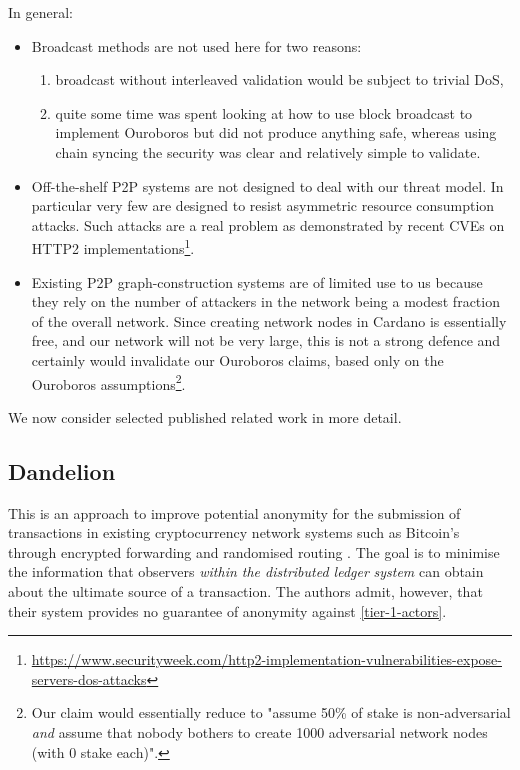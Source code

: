 \documentclass[11pt,a4paper]{article}
\begin{document}
In general:

\begin{itemize}
\item
  Broadcast methods are not used here for two reasons:

  \begin{enumerate}
  \def\labelenumi{\alph{enumi}.}
  \item
    broadcast without interleaved validation would be subject to trivial
    DoS,
  \item
    quite some time was spent looking at how to use block broadcast to
    implement Ouroboros but did not produce anything safe, whereas using
    chain syncing the security was clear and relatively simple to
    validate.
  \end{enumerate}
\item
  Off-the-shelf P2P systems are not designed to deal with our threat
  model. In particular very few are designed to resist asymmetric
  resource consumption attacks. Such attacks are a real problem as
  demonstrated by recent CVEs on HTTP2 implementations\footnote{\href{https://www.securityweek.com/http2-implementation-vulnerabilities-expose-servers-dos-attacks}{{https://www.securityweek.com/http2-implementation-vulnerabilities-expose-servers-dos-attacks}}}.
\item
  Existing P2P graph-construction systems are of limited use to us
  because they rely on the number of attackers in the network being a
  modest fraction of the overall network. Since creating network nodes
  in Cardano is essentially free, and our network will not be very
  large, this is not a strong defence and certainly would invalidate our
  Ouroboros claims, based only on the Ouroboros assumptions\footnote{Our
    claim would essentially reduce to "assume 50\% of stake is
    non-adversarial \emph{and} assume that nobody bothers to create
    1000 adversarial network nodes (with 0 stake each)".}.
\end{itemize}

We now consider selected published related work in more detail.

\subsection{Dandelion}
\label{dandelion}

This is an approach to improve potential anonymity for the submission of
transactions in existing cryptocurrency network systems such as
Bitcoin's through encrypted forwarding and randomised routing
\cite{VFV17}. The goal is to minimise the information that observers
\emph{within the distributed ledger} \emph{system} can obtain about the
ultimate source of a transaction. The authors admit, however, that their
system provides no guarantee of anonymity against
\cref{tier-1-actors}.
\end{document}
